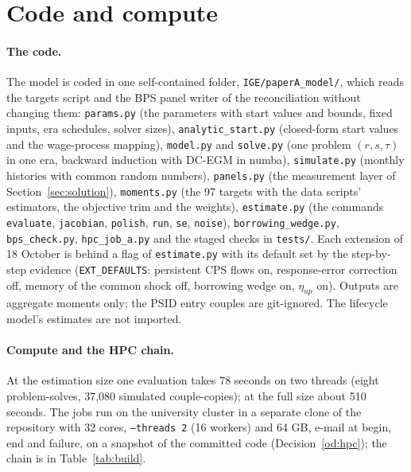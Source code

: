 \documentclass[11pt]{article}
\newcommand{\code}[1]{\texttt{#1}}
\newcommand{\1}{\mathbf{1}}
\begin{document}
\section{Code and compute}\label{sec:build}

\paragraph{The code.} The model is coded in one self-contained folder, \code{IGE/paperA\_model/}, which reads the
targets script and the BPS panel writer of the reconciliation without changing them: \code{params.py} (the parameters
with start values and bounds, fixed inputs, era schedules, solver sizes), \code{analytic\_start.py} (closed-form start
values and the wage-process mapping), \code{model.py} and \code{solve.py} (one problem $(r, s, \tau)$ in one era,
backward induction with DC-EGM in numba), \code{simulate.py} (monthly histories with common random numbers),
\code{panels.py} (the measurement layer of Section~\ref{sec:solution}), \code{moments.py} (the 97 targets with the data
scripts' estimators, the objective trim and the weights), \code{estimate.py} (the commands \code{evaluate},
\code{jacobian}, \code{polish}, \code{run}, \code{se}, \code{noise}), \code{borrowing\_wedge.py}, \code{bps\_check.py},
\code{hpc\_job\_a.py} and the staged checks in \code{tests/}. Each extension of 18 October is behind a flag of
\code{estimate.py} with its default set by the step-by-step evidence (\code{EXT\_DEFAULTS}: persistent CPS flows on,
response-error correction off, memory of the common shock off, borrowing wedge on, $\eta_{up}$ on). Outputs are
aggregate moments only; the PSID entry couples are git-ignored. The lifecycle model's estimates are not imported.

\paragraph{Compute and the HPC chain.} At the estimation size one evaluation takes 78 seconds on two threads (eight
problem-solves, 37{,}080 simulated couple-copies); at the full size about 510 seconds. The jobs run on the university
cluster in a separate clone of the repository with 32 cores, \code{--threads 2} (16 workers) and 64 GB, e-mail at begin,
end and failure, on a snapshot of the committed code (Decision~\ref{od:hpc}); the chain is in Table~\ref{tab:build}.
\end{document}
